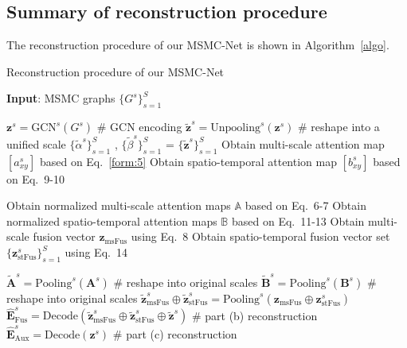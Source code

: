 \documentclass[journal]{IEEEtran}
\begin{document}
\subsection{Summary of reconstruction procedure}
The reconstruction procedure of our MSMC-Net is shown in Algorithm~\ref{algo}.

\begin{algorithm}[]
\caption{Reconstruction procedure of our MSMC-Net}
\label{algo}
\textbf{Input}: MSMC graphs $ \{G^{s}\}_{s=1}^{S} $
\begin{algorithmic}[1] %
\STATE $\mathbf{z}^s = {\mathrm{GCN}}^s\left( G^s\right)$ \# GCN encoding
\STATE $\tilde{\mathbf{z}}^{s} = {\mathrm{Unpooling}}^s\left( \mathbf{z}^s\right)$  \# reshape into a unified scale
\STATE $\{{\tilde{\alpha}}^{s}\}_{s=1}^{S}$ , $\{\tilde{\beta}^{s}\}_{s=1}^{S}$ = $\{\tilde{\mathbf{z}}^{s}\}_{s=1}^{S}$
\STATE Obtain multi-scale attention map $[a_{xy}^{s}]$ based on Eq.~\ref{form:5}
\STATE Obtain spatio-temporal attention map $[b_{xy}^{s}]$ based on Eq.~9-10
\ENDFOR

\STATE Obtain normalized multi-scale attention maps $\mathbb{A}$ based on Eq.~6-7
\STATE Obtain normalized spatio-temporal attention maps $\mathbb{B}$ based on Eq.~11-13
\STATE Obtain multi-scale fusion vector $\mathbf{z}_{\mathrm{msFus}}$ using Eq.~8
\STATE Obtain spatio-temporal fusion vector set $\{ \mathbf{z}_{\mathrm{stFus}}^{s} \}^{S}_{s=1} $ using Eq.~14

\STATE $\tilde{\mathbf{A}}^{s} = {\mathrm{Pooling}}^s\left( \mathbf{A}^s\right)$  \# reshape into original scales
\STATE $\tilde{\mathbf{B}}^{s} = {\mathrm{Pooling}}^s\left( \mathbf{B}^s\right)$  \# reshape into original scales
\STATE $\tilde{\mathbf{z}}_{\mathrm{msFus}}^s \oplus \tilde{\mathbf{z}}_{\mathrm{stFus}}^s = {\mathrm{Pooling}}^s\left( \mathbf{z}_{\mathrm{msFus}} \oplus \mathbf{z}_{\mathrm{stFus}}^{s}\right)$
\STATE $\hat{\mathbf{E}}_{\mathrm{Fus}}^{s}= {\mathrm{Decode}}\left(\tilde{\mathbf{z}}_{\mathrm{msFus}}^s \oplus \tilde{\mathbf{z}}_{\mathrm{stFus}}^s \oplus \tilde{\mathbf{z}}^s \right)$ \# part (b) reconstruction
\STATE $\hat{\mathbf{E}}_{\mathrm{Aux}}^{s}= {\mathrm{Decode}}\left(\mathbf{z}^{s}\right)$ \# part (c) reconstruction
\ENDFOR


\end{algorithmic}
\end{algorithm}
\end{document}
